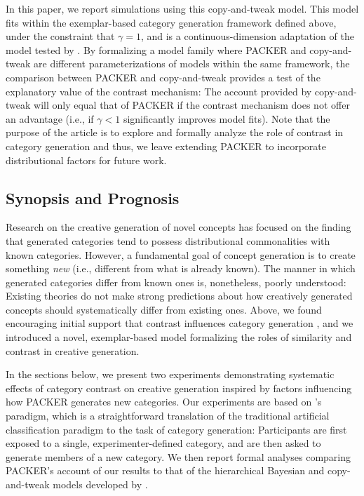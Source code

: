 \documentclass[12pt]{article}
\begin{document}
\begin{flushleft}
In this paper, we report simulations using this copy-and-tweak model. This model fits within the exemplar-based category generation framework defined above, under the constraint that $\gamma = 1$, and is a continuous-dimension adaptation of the model tested by \cite{jern2013probabilistic}. By formalizing a model family where PACKER and copy-and-tweak are different parameterizations of models within the same framework, the comparison between PACKER and copy-and-tweak provides a test of the explanatory value of the contrast mechanism: The account provided by copy-and-tweak will only equal that of PACKER if the contrast mechanism does not offer an advantage (i.e., if $\gamma < 1$ significantly improves model fits). Note that the purpose of the article is to explore and formally analyze the role of contrast in category generation and thus, we leave extending PACKER to incorporate distributional factors \citep[as explored by][]{jern2013probabilistic} for future work.


\subsection{Synopsis and Prognosis}

Research on the creative generation of novel concepts has focused on the finding that generated categories tend to possess distributional commonalities with known categories. However, a fundamental goal of concept generation is to create something {\em new} (i.e., different from what is already known). The manner in which generated categories differ from known ones is, nonetheless, poorly understood: Existing theories do not make strong predictions about how creatively generated concepts should systematically differ from existing ones. Above, we found encouraging initial support that contrast influences category generation \citep[][Experiment 3]{jern2013probabilistic}, and we introduced a novel, exemplar-based model formalizing the roles of similarity and contrast in creative generation.

In the sections below, we present two experiments demonstrating systematic effects of category contrast on creative generation inspired by factors influencing how PACKER generates new categories. Our experiments are based on \cite{jern2013probabilistic}'s paradigm, which is a straightforward translation of the traditional artificial classification paradigm to the task of category generation: Participants are first exposed to a single, experimenter-defined category, and are then asked to generate members of a new category. We then report formal analyses comparing PACKER's account of our results to that of the hierarchical Bayesian and copy-and-tweak models developed by \cite{jern2013probabilistic}.


\end{flushleft}
\end{document}
